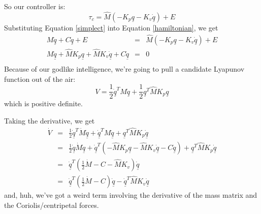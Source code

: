 \documentclass[]{article}
\begin{document}
So our controller is:
\begin{equation}
 \tau_{c} = \hat{M}\left(-K_{p}\underline{q} - K_{v}\dot{\underline{q}}\right) + E \label{simplect}
\end{equation}
Substituting Equation \ref{simplect} into Equation \ref{hamiltonian}, we get
\begin{eqnarray}
 M\ddot{\underline{q}} + C\dot{\underline{q}} + E & = & \hat{M}\left(-K_{p}\underline{q} - K_{v}\dot{\underline{q}}\right) + E \nonumber \\
 M\underline{\ddot{q}} + \hat{M}K_{p}\underline{q} + \hat{M}K_{v}\dot{\underline{q}} + C\dot{\underline{q}} & = & 0 \nonumber \\
\end{eqnarray}
Because of our godlike intelligence, we're going to pull a candidate Lyapunov function out of the air:
\begin{displaymath}
 V = \frac{1}{2}\dot{\underline{q}}^{T}M\underline{\dot{q}} + \frac{1}{2}\underline{q}^{T}\hat{M}K_{p}\underline{q}
\end{displaymath}
which is positive definite.

Taking the derivative, we get
\begin{eqnarray}
 \dot{V} & = & \frac{1}{2}\dot{\underline{q}}^{T}\dot{M}\dot{\underline{q}} + \underline{\dot{q}}^{T}M\underline{\ddot{q}} + \underline{q}^{T}\hat{M}K_{p}\dot{\underline{q}} \nonumber \\
 & = & \frac{1}{2}\underline{\dot{q}}\dot{M}\underline{\dot{q}} + \dot{\underline{q}}^{T}\left( -\hat{M}K_{p}\underline{q} - \hat{M}K_{v}\dot{\underline{q}}-C\dot{\underline{q}}\right) + \underline{q}^{T}\hat{M}K_{p}\dot{\underline{q}} \nonumber \\& = & \dot{\underline{q}}^{T}\left(\frac{1}{2}\dot{M} - C - \hat{M}K_{v}\right)\dot{\underline{q}} \nonumber \\
 & = & \dot{\underline{q}}^{T}\left( \frac{1}{2}\dot{M} - C\right)\dot{\underline{q}} - \dot{\underline{q}}^{T}\hat{M}K_{v}\dot{\underline{q}} \label{lyap1}
\end{eqnarray}
and, huh, we've got a weird term involving the derivative of the mass matrix and the Coriolis/centripetal forces. 
\end{document}
